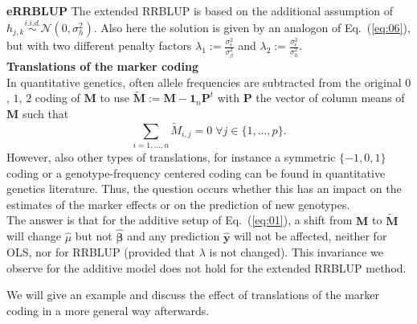 \documentclass{bmcart}
\newcommand{\M}{\mathbf{M}}
\newcommand{\0}{\mathbf{0}}
\renewcommand{\P}{\mathbf{P}}
\begin{document}
{\bf eRRBLUP}
The extended RRBLUP is based on the additional assumption of $h_{j,k }\stackrel{i.i.d.}{\sim} \mathcal{N}(0,\sigma_h^2 )$. Also here the solution is given by an analogon of Eq.~(\ref{eq:06}), but with two different penalty factors $\lambda_1:=\frac{\sigma_\epsilon^2}{\sigma_\beta^2}$ and $\lambda_2:=\frac{\sigma_\epsilon^2}{\sigma_h^2}$.
\vspace{0.4cm}\\
{\bf Translations of the marker coding}\vspace{0.2cm}\\
In quantitative genetics, often allele frequencies are subtracted from the original $0$, $1$, $2$ coding of $\M$ to 
use $\tilde{\M}:=\M-\mathbf{1}_n\P^t$ with $\P$ the vector of column means of $\M$ such that $$\sum\limits_{i=1,...,n} \tilde{M}_{i,j} = 0\; \forall j \in \{1,...,p\}.$$ However, also other types of translations, for instance a symmetric $\{-1,0,1\}$ coding or a genotype-frequency centered coding \cite{alvarez2007unified} can be found in quantitative genetics literature. Thus, the question occurs whether this has an impact on the estimates of the marker effects or on the prediction of new genotypes. \\

The answer is that for the additive setup of Eq.~(\ref{eq:01}), a shift from $\M$ to $\tilde{\M}$ will change $\hat{\mu}$ but not $\hat{\bm{\beta}}$ and any prediction $\hat{\mathbf{y}}$ will not be affected, neither for OLS, nor for RRBLUP (provided that $\lambda$ is not changed). This invariance we observe for the additive model does not hold for the extended RRBLUP method.

We will give an example and discuss the effect of translations of the marker coding in a more general way afterwards. \\
\end{document}
